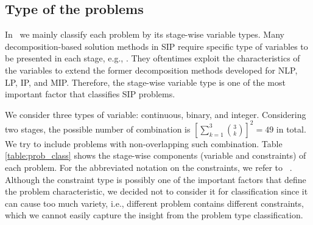 \subsection{Type of the problems}
In \siplibtwo\, we mainly classify each problem by its stage-wise variable types. Many decomposition-based solution methods in SIP require specific type of variables to be presented in each stage, e.g., \cite{journal:LL1993,journal:SSV1998,journal:CT1998,journal:CS1999,journal:SF2002}. They oftentimes exploit the characteristics of the variables to extend the former decomposition methods developed for NLP, LP, IP, and MIP. Therefore, the stage-wise variable type is one of the most important factor that classifies SIP problems.

We consider three types of variable: continuous, binary, and integer. Considering two stages, the possible number of combination is $\left[\sum_{k=1}^3\binom{3}{k}\right]^2=49$ in total. We try to include problems with non-overlapping such combination. Table \ref{table:prob_class} shows the stage-wise components (variable and constraints) of each problem. For the abbreviated notation on the constraints, we refer to \miplib\ \cite{MIPLIB}. Although the constraint type is possibly one of the important factors that define the problem characteristic, we decided not to consider it for classification since it can cause too much variety, i.e., different problem contains different constraints, which we cannot easily capture the insight from the problem type classification. 
